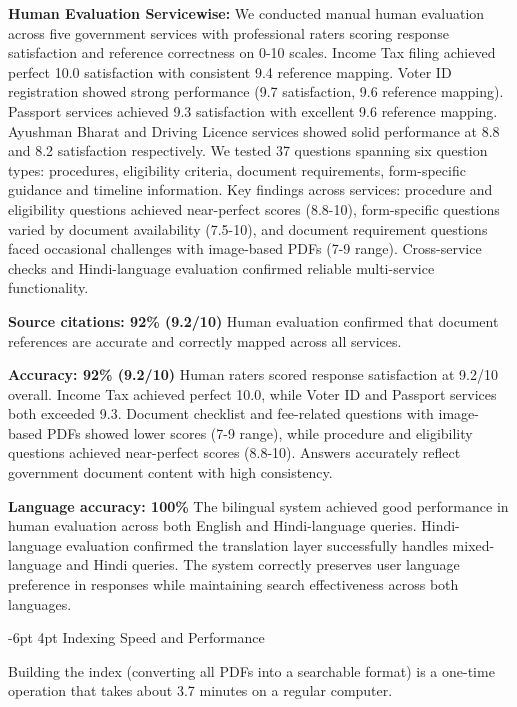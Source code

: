 \documentclass[10pt,twocolumn]{article}
\makeatletter
\renewcommand{\subsection}{\@startsection{subsection}{2}{\z@}%
  {-6pt \@plus -1pt \@minus -0.5pt}%
  {4pt \@plus 0.2pt}%
  {\normalfont\large\bfseries}}
\makeatother
\begin{document}
\noindent\textbf{Human Evaluation Servicewise:}  We conducted manual human evaluation across five government services with professional raters scoring response satisfaction and reference correctness on 0-10 scales. Income Tax filing achieved perfect 10.0 satisfaction with consistent 9.4
 reference mapping. Voter ID registration showed strong performance (9.7 satisfaction, 9.6 reference mapping). Passport services achieved 9.3 satisfaction 
 with excellent 9.6 reference mapping. Ayushman Bharat and Driving Licence services showed solid performance at 8.8 and 8.2 satisfaction respectively. We tested 37 questions spanning six question types: procedures, eligibility criteria, document requirements, form-specific guidance and timeline information. Key findings across services: procedure and eligibility questions achieved near-perfect scores (8.8-10), form-specific questions varied by document availability (7.5-10), and document requirement questions faced occasional challenges with image-based PDFs (7-9 range). Cross-service checks and Hindi-language evaluation confirmed reliable multi-service functionality.

\noindent\textbf{Source citations: 92\% (9.2/10)}  Human evaluation confirmed that document references are accurate and correctly mapped across all services. 

\noindent\textbf{Accuracy: 92\% (9.2/10)}  Human raters scored response satisfaction at 9.2/10 overall. Income Tax achieved perfect 10.0, while Voter ID and Passport services both exceeded 9.3. Document checklist and fee-related questions with image-based PDFs showed lower scores (7-9 range), while procedure and eligibility questions achieved near-perfect scores (8.8-10). Answers accurately reflect government document content with high consistency.

\noindent\textbf{Language accuracy: 100\% }  The bilingual system achieved good performance in human evaluation across both English and Hindi-language queries. Hindi-language evaluation confirmed the translation layer successfully handles mixed-language and Hindi queries. The system correctly preserves user language preference in responses while maintaining search effectiveness across both languages.


\subsection{Indexing Speed and Performance}

Building the index (converting all PDFs into a searchable format) is a one-time operation that takes about 3.7 minutes on a regular computer.
\end{document}
